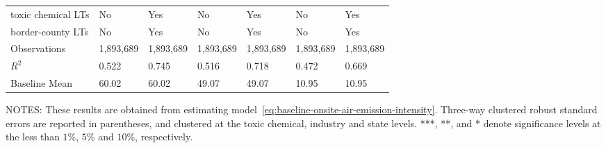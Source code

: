 \begin{table}[H]
{\begin{tabular}{@{}lllllll@{}}
            toxic chemical LTs            & No        & Yes       & No        & Yes       & No        & Yes       \\
            border-county LTs             & No        & Yes       & No        & Yes       & No        & Yes       \\ \midrule
            Observations                  & 1,893,689 & 1,893,689 & 1,893,689 & 1,893,689 & 1,893,689 & 1,893,689 \\
            $R^2$                         & 0.522     & 0.745     & 0.516     & 0.718     & 0.472     & 0.669     \\
            Baseline Mean                 & 60.02     & 60.02     & 49.07     & 49.07     & 10.95     & 10.95     \\ \bottomrule\bottomrule
        \end{tabular}%
    }
    \begin{minipage}{\columnwidth}
        \vspace{0.05in}
        NOTES: These results are obtained from estimating model~\ref{eq:baseline-onsite-air-emission-intensity}. Three-way clustered robust standard errors are reported in parentheses, and clustered at the toxic chemical, industry and state levels. ***, **, and * denote significance levels at the less than $1\%$, $5\%$ and $10\%$, respectively.
    \end{minipage}
\end{table}